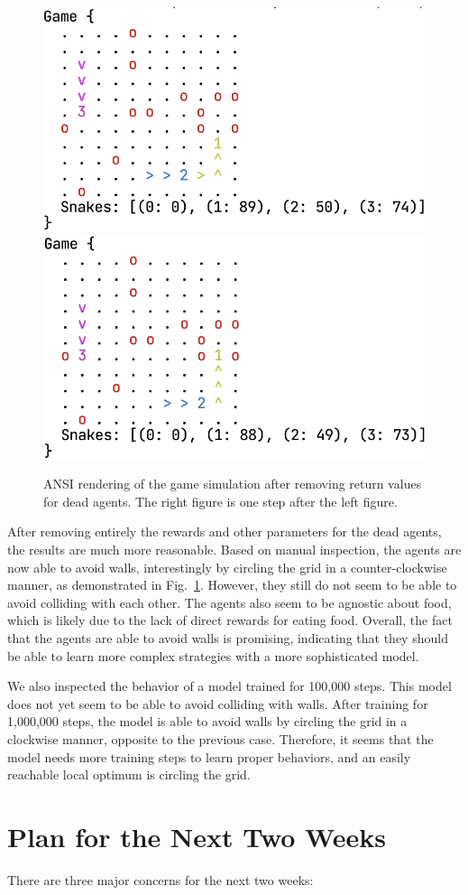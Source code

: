 \documentclass[a4paper]{article}
\begin{document}
\begin{figure}
    \centering
    \includegraphics[width=0.4\linewidth]{game_render_eg2.png}\quad
    \includegraphics[width=0.4\linewidth]{game_render_eg3.png}
    \caption{ANSI rendering of the game simulation after removing return values
        for dead agents. The right figure is one step after the left figure.
    }
    \label{fig:render2}
\end{figure}

After removing entirely the rewards and other parameters for the dead agents,
the results are much more reasonable. Based on manual inspection,
the agents are now able to avoid walls,
interestingly by circling the grid in a counter-clockwise manner,
as demonstrated in Fig.~\ref{fig:render2}. However,
they still do not seem to be able to avoid colliding with each other.
The agents also seem to be agnostic about food,
which is likely due to the lack of direct rewards for eating food. Overall,
the fact that the agents are able to avoid walls is promising,
indicating that they should be able to learn more complex strategies with a more
sophisticated model.

We also inspected the behavior of a model trained for 100,000 steps.
This model does not yet seem to be able to avoid colliding with walls.
After training for 1,000,000 steps,
the model is able to avoid walls by circling the grid in a clockwise manner,
opposite to the previous case. Therefore,
it seems that the model needs more training steps to learn proper behaviors,
and an easily reachable local optimum is circling the grid.

\section{Plan for the Next Two Weeks}

There are three major concerns for the next two weeks:
\end{document}

